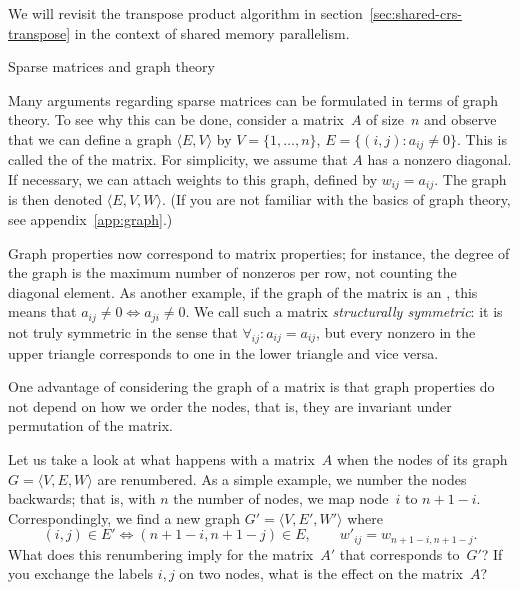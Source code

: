 We will revisit the transpose product algorithm in
section~\ref{sec:shared-crs-transpose} in the context of shared memory
parallelism.



 {Sparse matrices and graph theory}
\label{sec:sparse-graph}

Many arguments regarding sparse matrices can be formulated in terms of
graph theory.  To see why this can be done,
consider a matrix~$A$ of size~$n$ and observe that we can
define a graph $\langle E,V\rangle$ by $V=\{1,\ldots,n\}$, $E=\{(i,j)\colon
a_{ij}\not=0\}$. This is called the  of the
matrix. For simplicity, we assume that $A$ has a nonzero
diagonal. 
If
necessary, we can attach weights to this graph, defined by
$w_{ij}=a_{ij}$. The graph is then denoted $\langle E,V,W\rangle$.
(If you are not familiar with the basics of graph
theory, see appendix~\ref{app:graph}.)

Graph properties now correspond to matrix properties; for instance,
the degree of the graph is the maximum number of nonzeros per row, not
counting the diagonal element. As another example, if the graph of the
matrix is an , this means that
$a_{ij}\not=0\Leftrightarrow a_{ji}\not=0$. We call such a matrix
\emph{structurally symmetric}:
it is not truly symmetric in the
sense that $\forall_{ij}\colon a_{ij}=a_{ij}$, but every nonzero in
the upper triangle corresponds to one in the lower triangle and vice versa.

One advantage of considering the graph of a matrix is that graph properties
do not depend on how we order the nodes, that is, they are invariant
under permutation of the matrix.

\begin{exercise}
  Let us take a look at what happens with a matrix~$A$ when the nodes
  of its graph $G=\langle V,E,W\rangle$ are renumbered. As a simple example,
  we number the nodes backwards; that is, with $n$ the number of
  nodes, we map node~$i$ to $n+1-i$.
  Correspondingly, we find a new graph
  $G'=\langle V,E',W'\rangle$ where
  \[ (i,j)\in E'\Leftrightarrow (n+1-i,n+1-j)\in E,\qquad
  w'_{ij}=w_{n+1-i,n+1-j}.\]
  What does this renumbering imply for the matrix~$A'$ that
  corresponds to~$G'$? If you exchange the labels $i,j$ on two nodes,
  what is the effect on the matrix~$A$?
\end{exercise}


